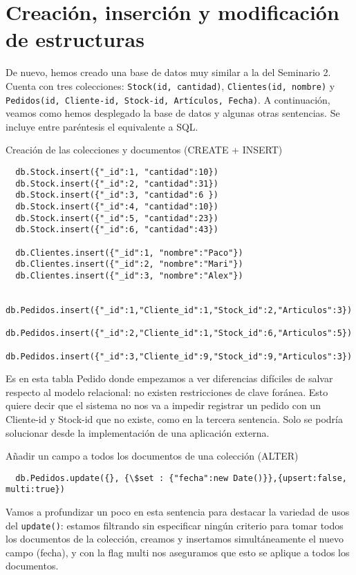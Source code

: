 \chapter{Creación, inserción y modificación de estructuras}
De nuevo, hemos creado una base de datos muy similar a la del Seminario 2. Cuenta con tres colecciones: \texttt{Stock(id, cantidad)}, \texttt{Clientes(id, nombre)} y \texttt{Pedidos(id, Cliente-id, Stock-id, Artículos, Fecha)}. A continuación, veamos como hemos desplegado la base de datos y algunas otras sentencias. Se incluye entre paréntesis el equivalente a SQL.

\bigskip
{\large Creación de las colecciones y documentos (CREATE + INSERT)}
  \begin{lstlisting}
  db.Stock.insert({"_id":1, "cantidad":10})
  db.Stock.insert({"_id":2, "cantidad":31})
  db.Stock.insert({"_id":3, "cantidad":6 })
  db.Stock.insert({"_id":4, "cantidad":10})
  db.Stock.insert({"_id":5, "cantidad":23})
  db.Stock.insert({"_id":6, "cantidad":43})

  db.Clientes.insert({"_id":1, "nombre":"Paco"})
  db.Clientes.insert({"_id":2, "nombre":"Mari"})
  db.Clientes.insert({"_id":3, "nombre":"Alex"})

  db.Pedidos.insert({"_id":1,"Cliente_id":1,"Stock_id":2,"Articulos":3})
  db.Pedidos.insert({"_id":2,"Cliente_id":1,"Stock_id":6,"Articulos":5})
  db.Pedidos.insert({"_id":3,"Cliente_id":9,"Stock_id":9,"Articulos":3})
  \end{lstlisting}

  Es en esta tabla Pedido donde empezamos a ver diferencias difíciles de salvar respecto al modelo relacional: no existen restricciones de clave foránea. Esto quiere decir que el sistema no nos va a impedir registrar un pedido con un Cliente-id y Stock-id que no existe, como en la tercera sentencia. Solo se podría solucionar desde la implementación de una aplicación externa.

\bigskip
{\large Añadir un campo a todos los documentos de una colección (ALTER)}

  \begin{lstlisting}
  db.Pedidos.update({}, {\$set : {"fecha":new Date()}},{upsert:false, multi:true})
  \end{lstlisting}

  Vamos a profundizar un poco en esta sentencia para destacar la variedad de usos del \texttt{update()}: estamos filtrando sin especificar ningún criterio para tomar todos los documentos de la colección, creamos y insertamos simultáneamente el nuevo campo (fecha), y con la flag multi nos aseguramos que esto se aplique a todos los documentos.


